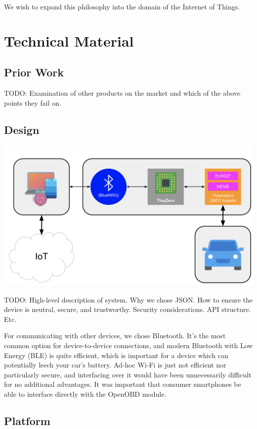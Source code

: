 \documentclass[10pt,letterpaper,unboxed,cm]{article}
\newcommand{\todo}{\color{red} TODO: \color{black}}
\begin{document}
We wish to expand this philosophy into the domain of the Internet of Things.

\section{Technical Material}

\subsection{Prior Work}

\todo Examination of other products on the market and which of the above points they fail on.

\subsection{Design}

\begin{center}
\includegraphics[width=0.7\linewidth]{pathway.png}
\end{center}

\todo High-level description of system. Why we chose JSON. How to ensure the device is neutral, secure, and trustworthy. Security considerations. API structure. Etc.

For communicating with other devices, we chose Bluetooth. It's the most common option for device-to-device connections, and modern Bluetooth with Low Energy (BLE) is quite efficient, which is important for a device which can potentially leech your car's battery. Ad-hoc Wi-Fi is just not efficient nor particularly secure, and interfacing over it would have been unnecessarily difficult for no additional advantages. It was important that consumer smartphones be able to interface directly with the OpenOBD module.

\subsection{Platform}
\end{document}
